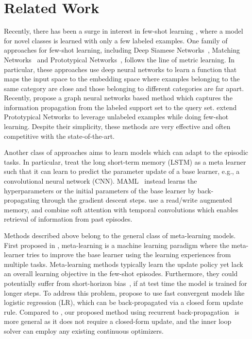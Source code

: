 \section{Related Work}
Recently, there has been a surge in interest in few-shot learning
\citep{koch2015siamese,matching,proto,lake2011oneshot}, where a model for novel classes is learned
with only a few labeled examples. One family of approaches for few-shot learning, including Deep
Siamese Networks~\citep{koch2015siamese}, Matching Networks~\citep{matching} and Prototypical
Networks~\citep{proto}, follows the line of metric learning. In particular, these approaches use deep
neural networks to learn a function that maps the input space to the embedding space where examples
belonging to the same category are close and those belonging to different categories are far apart.
Recently, \citet{garcia2017few} propose a graph neural networks based method which captures the
information propagation from the labeled support set to the query set. \citet{fewshotssl} extend
Prototypical Networks to leverage unlabeled examples while doing few-shot learning. Despite their
simplicity, these methods are very effective and often competitive with the state-of-the-art.

Another class of approaches aims to learn models which can adapt to the episodic tasks. In
particular, \citet{metalstm} treat the long short-term memory (LSTM) as a meta learner such that it
can learn to predict the parameter update of a base learner, e.g., a convolutional neural network
(CNN). MAML~\citep{maml} instead learns the hyperparameters or the initial parameters of the base
learner by back-propagating through the gradient descent steps. \citet{santoro2016one} use a
read/write augmented memory, and \citet{mishra2017meta} combine soft attention with temporal
convolutions which enables retrieval of information from past episodes.

Methods described above belong to the general class of meta-learning models. First proposed in
\citet{Schmidhuber1987evolutionary,naik1992meta,Thrun1998}, meta-learning is a machine learning
paradigm where the meta-learner tries to improve the base learner using the learning experiences
from multiple tasks. Meta-learning methods typically learn the update policy yet lack an overall
learning objective in the few-shot episodes. Furthermore, they could potentially suffer from
short-horizon bias~\citep{shorthorizon}, if at test time the model is trained for longer steps. To
address this problem, \citet{diffsolver} propose to use fast convergent models like logistic
regression (LR), which can be back-propagated via a closed form update rule. Compared to 
\citet{diffsolver}, our proposed method using recurrent back-propagation~\citep{rbp,rbp2,rbp3} is more
general as it does not require a closed-form update, and the inner loop solver can employ any
existing continuous optimizers.

